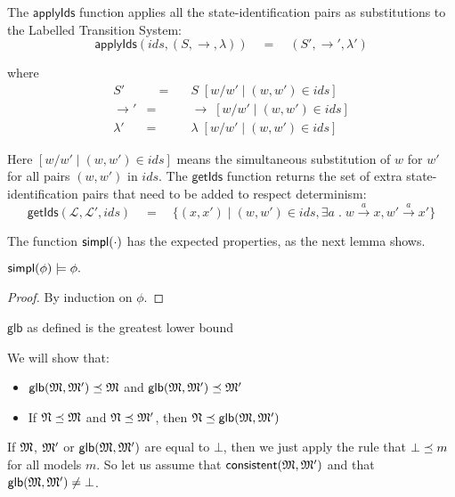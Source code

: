 \NI The $\mathsf{applyIds}$ function applies all the
state-identification pairs as substitutions to the Labelled Transition
System:
\[
   \mathsf{applyIds}(ids, (S, \rightarrow, \lambda)) 
      \quad=\quad 
   (S', \rightarrow', \lambda')
\]

\NI where
\begin{eqnarray*}
  S' &\quad =\quad & S \; [ w / w' \; | \; (w,w') \in ids] \\
  \rightarrow' & = & \rightarrow \; [ w / w' \; | \; (w,w') \in ids] \\
  \lambda' & = & \lambda \; [ w / w' \; | \; (w,w') \in ids]
\end{eqnarray*}

\NI Here $[ w / w' \; | \; (w,w') \in ids]$ means the simultaneous
substitution of $w$ for $w'$ for all pairs $(w, w')$ in $ids$.  The
$\mathsf{getIds}$ function returns the set of extra
state-identification pairs that need to be added to respect
determinism:
\[
   \mathsf{getIds}(\mathcal{L}, \mathcal{L}', ids) 
      \quad=\quad 
   \{(x,x') \; | \; (w,w') \in ids, \exists a \; . \; w \xrightarrow{a} x, w' \xrightarrow{a} x'\}
\]

\NI The function $\mathsf{simpl}(\cdot)$ has the expected properties, as the next
lemma shows.  

\begin{lemma}
$\mathsf{simpl}(\phi) \models \phi.$
\end{lemma}
\begin{proof}
By induction on $\phi$.
\end{proof}

\begin{lemma}
$\mathsf{glb}$ as defined is the greatest lower bound
\end{lemma}
We will show that:
\begin{itemize}
\item
$\mathsf{glb}(\frak{M}, \frak{M}') \preceq \frak{M}$ and $\mathsf{glb}(\frak{M}, \frak{M}') \preceq \frak{M}'$
\item
If $\frak{N} \preceq \frak{M}$ and $\frak{N} \preceq \frak{M}'$, then $\frak{N} \preceq \mathsf{glb}(\frak{M}, \frak{M}')$
\end{itemize}
If $\frak{M}$, $ \frak{M}'$ or $\mathsf{glb}(\frak{M}, \frak{M}')$ are equal to $\bot$, then we just apply the rule that $\bot \preceq m$ for all models $m$. 
So let us assume that $\mathsf{consistent}(\frak{M}, \frak{M}')$ and that $\mathsf{glb}(\frak{M}, \frak{M}')  \neq \bot$.

